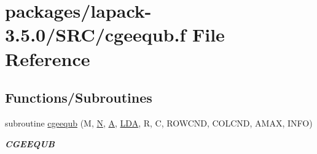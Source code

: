 \hypertarget{cgeequb_8f}{}\section{packages/lapack-\/3.5.0/\+S\+R\+C/cgeequb.f File Reference}
\label{cgeequb_8f}
\subsection*{Functions/\+Subroutines}
\begin{DoxyCompactItemize}
\item 
subroutine \hyperlink{group__complexGEcomputational_gaf527e1b73b72fd18b249ff470f02032e}{cgeequb} (M, \hyperlink{polmisc_8c_a0240ac851181b84ac374872dc5434ee4}{N}, \hyperlink{classA}{A}, \hyperlink{example__user_8c_ae946da542ce0db94dced19b2ecefd1aa}{L\+D\+A}, R, C, R\+O\+W\+C\+N\+D, C\+O\+L\+C\+N\+D, A\+M\+A\+X, I\+N\+F\+O)
\begin{DoxyCompactList}\small\item\em {\bfseries C\+G\+E\+E\+Q\+U\+B} \end{DoxyCompactList}\end{DoxyCompactItemize}
